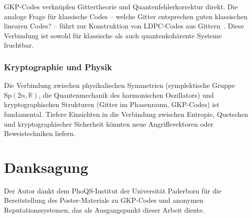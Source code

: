 ﻿\documentclass[a4paper,12pt]{article}
\theoremstyle{definition}
\newcommand{\R}{\mathbb{R}}
\begin{document}
GKP-Codes verknüpfen Gittertheorie und Quantenfehlerkorrektur direkt.
Die analoge Frage für klassische Codes -- welche Gitter entsprechen guten
klassischen linearen Codes? -- führt zur Konstruktion von LDPC-Codes aus Gittern~\cite{Sipser1996}.
Diese Verbindung ist sowohl für klassische als auch quantenkohärente Systeme fruchtbar.

\subsubsection{Kryptographie und Physik}

Die Verbindung zwischen physikalischen Symmetrien (symplektische Gruppe $\mathrm{Sp}(2n,\R)$,
die Quantenmechanik des harmonischen Oszillators) und kryptographischen Strukturen
(Gitter im Phasenraum, GKP-Codes) ist fundamental.
Tiefere Einsichten in die Verbindung zwischen Entropie, Quetschen und
kryptographischer Sicherheit könnten neue Angriffsvektoren oder Beweistechniken liefern.

\section*{Danksagung}

Der Autor dankt dem PhoQS-Institut der Universität Paderborn für die
Bereitstellung des Poster-Materials zu GKP-Codes und anonymen Reputationssystemen,
das als Ausgangspunkt dieser Arbeit diente.
\end{document}
